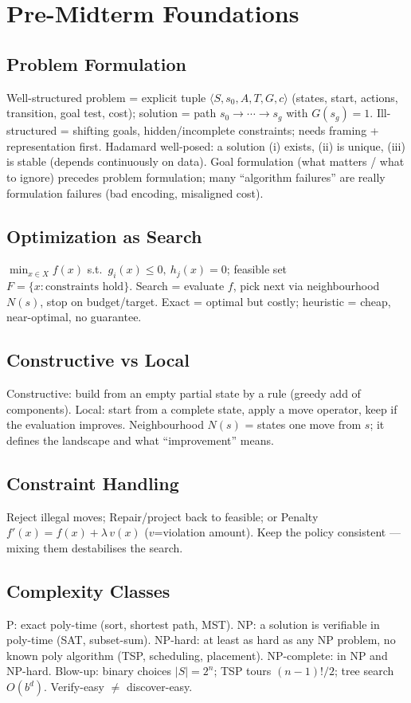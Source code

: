 \section{Pre-Midterm Foundations}
\subsection*{Problem Formulation}
Well-structured problem = explicit tuple \(\langle S,s_0,A,T,G,c\rangle\) (states, start, actions, transition, goal test, cost); solution = path \(s_0\!\to\!\cdots\!\to\!s_g\) with \(G(s_g){=}1\). Ill-structured = shifting goals, hidden/incomplete constraints; needs framing + representation first. Hadamard well-posed: a solution (i) exists, (ii) is unique, (iii) is stable (depends continuously on data). Goal formulation (what matters / what to ignore) precedes problem formulation; many ``algorithm failures'' are really formulation failures (bad encoding, misaligned cost).

\subsection*{Optimization as Search}
\(\min_{x\in X} f(x)\) s.t.\ \(g_i(x)\le0,\ h_j(x)=0\); feasible set \(F=\{x: \text{constraints hold}\}\). Search = evaluate \(f\), pick next via neighbourhood \(N(s)\), stop on budget/target. Exact = optimal but costly; heuristic = cheap, near-optimal, no guarantee.

\subsection*{Constructive vs Local}
Constructive: build from an empty partial state by a rule (greedy add of components). Local: start from a complete state, apply a move operator, keep if the evaluation improves. Neighbourhood \(N(s)\) = states one move from \(s\); it defines the landscape and what ``improvement'' means.

\subsection*{Constraint Handling}
Reject illegal moves; Repair/project back to feasible; or Penalty \(f'(x)=f(x)+\lambda\,v(x)\) (\(v\)=violation amount). Keep the policy consistent --- mixing them destabilises the search.

\subsection*{Complexity Classes}
P: exact poly-time (sort, shortest path, MST). NP: a solution is verifiable in poly-time (SAT, subset-sum). NP-hard: at least as hard as any NP problem, no known poly algorithm (TSP, scheduling, placement). NP-complete: in NP and NP-hard. Blow-up: binary choices \(|S|{=}2^n\); TSP tours \((n{-}1)!/2\); tree search \(O(b^d)\). Verify-easy \(\ne\) discover-easy.

